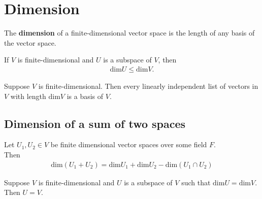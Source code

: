 \documentclass{memoir}
\begin{document}
\section{Dimension}%
\label{cha:dimension}
\begin{defn}[Dimension]
	The \textbf{dimension} of a finite-dimensional vector space is the length of any basis of the vector space.
\end{defn}
\begin{lemma}
	If $V$ is finite-dimensional and $U$ is a subspace of $V$, then
	\begin{align*}
	\text{dim}U \leq \text{dim}V.
	\end{align*}
\end{lemma}

\begin{lemma}
	Suppose $V$ is finite-dimensional. Then every linearly independent list of vectors in $V$ with length $\text{dim}V$ is a basis of $V$.
\end{lemma}
\subsection{Dimension of a sum of two spaces}
\begin{prop}
Let $U_1,U_2 \in V$ be finite dimensional vector spaces over some field $F$.\\

Then
\begin{align*}
	\textrm{dim}(U_1+U_2) = \textrm{dim}U_1 + \textrm{dim}U_2 - \textrm{dim}(U_1\cap U_2)
\end{align*}
\end{prop}
\begin{cor}
	Suppose $V$ is finite-dimensional and $U$ is a subspace of $V$ such that $\text{dim}U = \text{dim}V$. Then $U = V$.
\end{cor}
\end{document}
